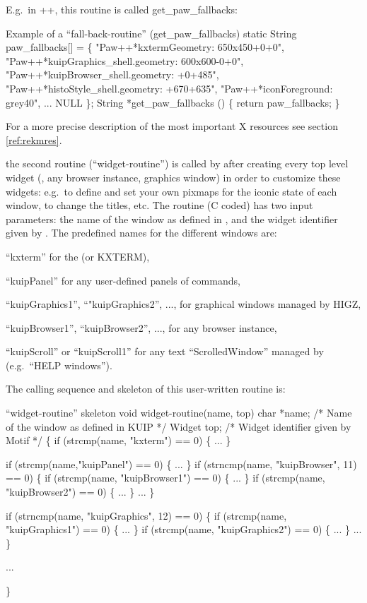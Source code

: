 \begin{UL}
E.g.\ in \PAW++{}, this routine is called get\_paw\_fallbacks:
\begin{XMPt} {Example of a ``fall-back-routine'' (get\_paw\_fallbacks)}
static String paw\_fallbacks[] = \{
 "Paw++*kxtermGeometry:                  650x450+0+0",
 "Paw++*kuipGraphics_shell.geometry:     600x600-0+0",
 "Paw++*kuipBrowser_shell.geometry:      +0+485",
 "Paw++*histoStyle_shell.geometry:       +670+635",
 "Paw++*iconForeground:                  grey40",
 ...
 NULL
\};
String *get\_paw\_fallbacks ()
\{
   return paw\_fallbacks;
\}
\end{XMPt}
For a more precise description of the most important \KUIPMotif{} X resources
see section \ref{ref:rekmres}.
\item
the second routine (``widget-routine'') is called by \KUIP{} after creating
every top level widget (\EW{}, any browser instance, graphics window)
in order to customize these widgets: e.g.\ to define and set your own
pixmaps for the iconic state of each window, to change the titles, etc.
\hfill\break
The routine (C coded) has two input parameters: the name of the window
as defined in \KUIP{}, and the widget identifier given by \Motif{}. The
\KUIP{} predefined names for the different windows are:
\begin{UL}
\item
     ``kxterm'' for the \EW{} (or KXTERM),
\item
     ``kuipPanel'' for any user-defined panels of commands,
\item
     ``kuipGraphics1'', ``"kuipGraphics2'', ..., for graphical windows managed
     by HIGZ,
\item
     ``kuipBrowser1'', ``kuipBrowser2'', ..., for any browser instance,
\item
     ``kuipScroll'' or ``kuipScroll1'' for any text ``ScrolledWindow''
     managed by \KUIP{} (e.g.\ ``HELP windows'').
\end{UL}
The calling sequence and skeleton of this user-written routine is:
\begin{XMPt} {``widget-routine'' skeleton}
void widget-routine(name, top)
     char *name;  /* Name of the window as defined in KUIP */
     Widget top;  /* Widget identifier given by Motif      */
\{
   if (strcmp(name, "kxterm") == 0) \{
      ...
   \}
 
   if (strcmp(name,"kuipPanel") == 0) \{
      ...
   \}
   if (strncmp(name, "kuipBrowser", 11) == 0) \{
      if (strcmp(name, "kuipBrowser1") == 0) \{
          ...
      \}
      if (strcmp(name, "kuipBrowser2") == 0) \{
          ...
      \}
      ...
   \}
 
   if (strncmp(name, "kuipGraphics", 12) == 0) \{
      if (strcmp(name, "kuipGraphics1") == 0) \{
          ...
      \}
      if (strcmp(name, "kuipGraphics2") == 0) \{
          ...
      \}
      ...
   \}
 
   ...
 
\}
\end{XMPt}
\end{UL}
 
